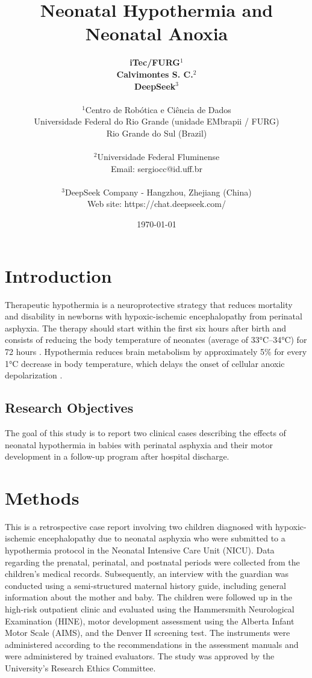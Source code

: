 \documentclass[11pt,a4paper]{article}
\title{\textbf{Neonatal Hypothermia and Neonatal Anoxia}}
\author{
	\textbf{iTec/FURG}$^{1}$ \\
	\textbf{Calvimontes S. C.}$^{2}$ \\
	\textbf{DeepSeek}$^{3}$ \\
	\\
	\small $^{1}$Centro de Robótica e Ciência de Dados \\
	\small Universidade Federal do Rio Grande (unidade EMbrapii / FURG) \\
	\small Rio Grande do Sul (Brazil) \\
	\\
	\small $^{2}$Universidade Federal Fluminense \\
	\small Email: sergiocc@id.uff.br \\
	\\
	\small $^{3}$DeepSeek Company - Hangzhou, Zhejiang (China) \\
	\small Web site: https://chat.deepseek.com/
}
\date{\today}
\begin{document}
	
	\maketitle
	
	\newpage
	
	\section{Introduction}
	Therapeutic hypothermia is a neuroprotective strategy that reduces mortality and disability in newborns with hypoxic-ischemic encephalopathy from perinatal asphyxia. The therapy should start within the first six hours after birth and consists of reducing the body temperature of neonates (average of 33°C--34°C) for 72 hours \cite{Azzopardi2014,Thayyil2021,Abate2021}. Hypothermia reduces brain metabolism by approximately 5\% for every 1°C decrease in body temperature, which delays the onset of cellular anoxic depolarization \cite{Silveira2015}.
		
	\subsection{Research Objectives}
	The goal of this study is to report two clinical cases describing the effects of neonatal hypothermia in babies with perinatal asphyxia and their motor development in a follow-up program after hospital discharge.
	
	\section{Methods}
	This is a retrospective case report involving two children diagnosed with hypoxic-ischemic encephalopathy due to neonatal asphyxia who were submitted to a hypothermia protocol in the Neonatal Intensive Care Unit (NICU). Data regarding the prenatal, perinatal, and postnatal periods were collected from the children's medical records. Subsequently, an interview with the guardian was conducted using a semi-structured maternal history guide, including general information about the mother and baby. The children were followed up in the high-risk outpatient clinic and evaluated using the Hammersmith Neurological Examination (HINE), motor development assessment using the Alberta Infant Motor Scale (AIMS), and the Denver II screening test. The instruments were administered according to the recommendations in the assessment manuals and were administered by trained evaluators. The study was approved by the University's Research Ethics Committee.
	
\end{document}
